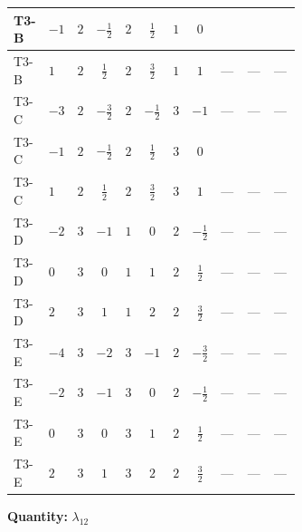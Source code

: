 \documentclass[8pt]{article}
\begin{document}
\begin{landscape}
\begin{longtable}{@{}llcccccc >{\raggedright\arraybackslash}p{0.21\linewidth} >{\raggedright\arraybackslash}p{0.21\linewidth} >{\raggedright\arraybackslash}p{0.21\linewidth}@{}}
\midrule
T3-B & $-1$ & $2$ & $-\frac{1}{2}$ & $2$ & $\frac{1}{2}$ & $1$ & $0$ & \scriptsize\adjustbox{max width=\linewidth}{$\begin{gathered} +6 {\lambda_{9}} \left({\lambda_{H H^\dagger S_1^\dagger S_2^\dagger}^{\rm Cross}}\right)^{*}\end{gathered}$} & \scriptsize\adjustbox{max width=\linewidth}{$\begin{gathered} -6 \left({\lambda_{8}}\right)^{*} \left({\lambda_5}\right)^{*}\end{gathered}$} & \scriptsize\adjustbox{max width=\linewidth}{$\begin{gathered} -9 {g_2}^2 {\lambda_{H H^\dagger S_1^\dagger S_2^\dagger}^{\rm Cross}}\end{gathered}$} \\
\midrule
T3-B & $1$ & $2$ & $\frac{1}{2}$ & $2$ & $\frac{3}{2}$ & $1$ & $1$ & --- & --- & --- \\
\midrule
T3-C & $-3$ & $2$ & $-\frac{3}{2}$ & $2$ & $-\frac{1}{2}$ & $3$ & $-1$ & --- & --- & --- \\
\midrule
T3-C & $-1$ & $2$ & $-\frac{1}{2}$ & $2$ & $\frac{1}{2}$ & $3$ & $0$ & \scriptsize\adjustbox{max width=\linewidth}{$\begin{gathered} +6 {\lambda_{9}} \left({\lambda_{H H^\dagger S_1^\dagger S_2^\dagger}^{\rm Cross}}\right)^{*}\end{gathered}$} & \scriptsize\adjustbox{max width=\linewidth}{$\begin{gathered} -6 \left({\lambda_{8}}\right)^{*} \left({\lambda_5}\right)^{*}\end{gathered}$} & \scriptsize\adjustbox{max width=\linewidth}{$\begin{gathered} -9 {g_2}^2 {\lambda_{H H^\dagger S_1^\dagger S_2^\dagger}^{\rm Cross}}\end{gathered}$} \\
\midrule
T3-C & $1$ & $2$ & $\frac{1}{2}$ & $2$ & $\frac{3}{2}$ & $3$ & $1$ & --- & --- & --- \\
\midrule
T3-D & $-2$ & $3$ & $-1$ & $1$ & $0$ & $2$ & $-\frac{1}{2}$ & --- & --- & --- \\
\midrule
T3-D & $0$ & $3$ & $0$ & $1$ & $1$ & $2$ & $\frac{1}{2}$ & --- & --- & --- \\
\midrule
T3-D & $2$ & $3$ & $1$ & $1$ & $2$ & $2$ & $\frac{3}{2}$ & --- & --- & --- \\
\midrule
T3-E & $-4$ & $3$ & $-2$ & $3$ & $-1$ & $2$ & $-\frac{3}{2}$ & --- & --- & --- \\
\midrule
T3-E & $-2$ & $3$ & $-1$ & $3$ & $0$ & $2$ & $-\frac{1}{2}$ & --- & --- & --- \\
\midrule
T3-E & $0$ & $3$ & $0$ & $3$ & $1$ & $2$ & $\frac{1}{2}$ & --- & --- & --- \\
\midrule
T3-E & $2$ & $3$ & $1$ & $3$ & $2$ & $2$ & $\frac{3}{2}$ & --- & --- & --- \\
\midrule
\bottomrule
\end{longtable}
\clearpage
\noindent\textbf{Quantity: }$\lambda_{12}$\par\smallskip

\end{landscape}
\end{document}
